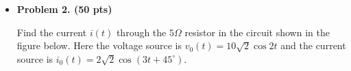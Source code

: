 \begin{itemize}
\item {\bf Problem 2. (50 pts)}

Find the current $i(t)$ through the $5\Omega$ resistor in the circuit shown in the 
figure below. Here the voltage source is $v_0(t)=10\sqrt{2}\cos 2t$ and the current
source is $i_0(t)=2\sqrt{2}\cos(3t+45^\circ)$. 



\end{itemize}

